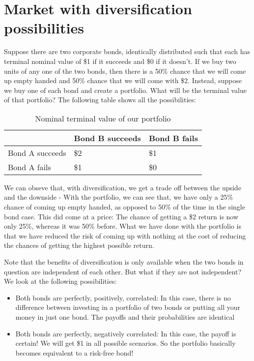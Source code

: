\section{Market with diversification possibilities}
Suppose there are two corporate bonds, identically distributed such that each has terminal nominal value of \$1 if it succeeds and \$0 if it doesn't. If we buy two units of any one of the two bonds, then there is a 50\% chance that we will come up empty handed and 50\% chance that we will come with \$2. Instead, suppose we buy one of each bond and create a portfolio. What will be the terminal value of that portfolio? The following table shows all the possibilities:
	\begin{table}[h]
	\begin{center}
	\begin{tabular}{l l l}
	\toprule
	 & Bond B succeeds & Bond B fails\\
	\midrule
	Bond A succeeds & \$2 & \$1\\
	Bond A fails & \$1 & \$0\\
	\bottomrule
	\end{tabular}
	\end{center}
	\caption{Nominal terminal value of our portfolio}
	\end{table}

We can obseve that, with diversification, we get a trade off between the upside and the downside - With the portfolio, we can see that, we have only a 25\% chance of coming up empty handed, as opposed to 50\% of the time in the single bond case. This did come at a price: The chance of getting a \$2 return is now only 25\%, whereas it was 50\% before. What we have done with the portfolio is that we have reduced the risk of coming up with nothing at the cost of reducing the chances of getting the highest possible return. 

Note that the benefits of diversification is only available when the two bonds in question are independent of each other. But what if they are not independent? We look at the following possibilities:
	\begin{itemize}
	\item Both bonds are perfectly, positively, correlated: In this case, there is no difference between investing in a portfolio of two bonds or putting all your money in just one bond. The payoffs and their probabilities are identical
	\item Both bonds are perfectly, negatively correlated: In this case, the payoff is certain! We will get \$1 in all possible scenarios. So the portfolio basically becomes equivalent to a risk-free bond! 
	\end{itemize}

